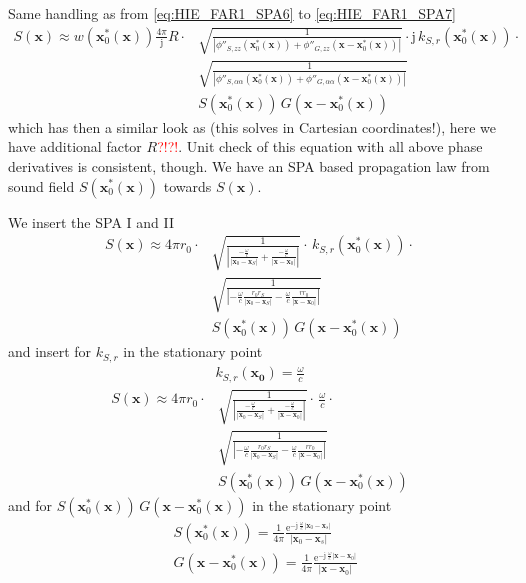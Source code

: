 \documentclass[a4paper,BCOR=15mm,10pt,twoside]{scrartcl}
\newcommand{\fscom}[2][red]{\textcolor{#1}{#2}}  %
\newcommand\e{\mathrm{e}}  %
\newcommand\im{\mathrm{j}}  %
\newcommand\wc{\frac{\omega}{c}}  %
\newcommand\jwc{\im\,\frac{\omega}{c}}  %
\newcommand\azx{\alpha}  %
\renewcommand{\vec}[1]{\mathbf{#1}}  %
\begin{document}
Same handling as from \eqref{eq:HIE_FAR1_SPA6} to \eqref{eq:HIE_FAR1_SPA7}
\begin{align}
S(\vec{x}) \approx w(\vec{x}_0^*(\vec{x})) \frac{4\pi}{\im}R \cdot
&  
\sqrt{\frac{1}{|\phi''_{S,zz}(\vec{x}_0^*(\vec{x}))+\phi''_{G,zz}(\vec{x}-\vec{x}_0^*(\vec{x}))|}} 
\cdot \im \, 
k_{S,r}(\vec{x}_0^*(\vec{x}))
\cdot\nonumber\\
&
\sqrt{\frac{1}{|\phi''_{S,\azx\azx}(\vec{x}_0^*(\vec{x}))+\phi''_{G,\azx\azx}(\vec{x}-\vec{x}_0^*(\vec{x}))|}}\nonumber\\
&
S(\vec{x}_0^*(\vec{x}))\,G(\vec{x}-\vec{x}_0^*(\vec{x}))
\end{align}
which has then a similar look as \cite[(38)]{Firtha2018} (this solves in Cartesian coordinates!), here we have additional factor $R$\fscom{?!?!}.
Unit check of this equation with all above phase derivatives is consistent, though.
We have an SPA based propagation law from sound field $S(\vec{x}_0^*(\vec{x}))$ towards $S(\vec{x})$.


We insert the SPA I and II
\begin{align}
S(\vec{x}) \approx 4 \pi r_0 \cdot
&  
\sqrt{\frac{1}{|\frac{-\wc}{|\vec{x}_0-\vec{x}_S|}+\frac{-\wc}{|\vec{x}-\vec{x}_0|}|}} 
\cdot \, 
k_{S,r}(\vec{x}_0^*(\vec{x}))
\cdot\nonumber\\
&
\sqrt{\frac{1}{|-\wc \frac{r_0 r_S}{|\vec{x}_0 -\vec{x}_S|}-\wc \frac{r r_0}{|\vec{x} -\vec{x}_0|}|}}\nonumber\\
&
S(\vec{x}_0^*(\vec{x}))\,G(\vec{x}-\vec{x}_0^*(\vec{x}))
\end{align}
and insert for $k_{S,r}$ in the stationary point
\begin{align}
k_{S,r}(\vec{x_0}) = \wc
\end{align}
\begin{align}
S(\vec{x}) \approx 4 \pi r_0 \cdot
&  
\sqrt{\frac{1}{|\frac{-\wc}{|\vec{x}_0-\vec{x}_S|}+\frac{-\wc}{|\vec{x}-\vec{x}_0|}|}} 
\cdot \, 
\wc
\cdot\nonumber\\
&
\sqrt{\frac{1}{|-\wc \frac{r_0 r_S}{|\vec{x}_0 -\vec{x}_S|}-\wc \frac{r r_0}{|\vec{x} -\vec{x}_0|}|}}\nonumber\\
&
S(\vec{x}_0^*(\vec{x}))\,G(\vec{x}-\vec{x}_0^*(\vec{x}))
\end{align}
and for $S(\vec{x}_0^*(\vec{x}))\,G(\vec{x}-\vec{x}_0^*(\vec{x}))$  in the stationary point
\begin{align}
&S(\vec{x}_0^*(\vec{x})) = \frac{1}{4\pi} \frac{\e^{-\jwc |\vec{x}_0-\vec{x}_s|}}{|\vec{x}_0-\vec{x}_s|}\\
&G(\vec{x}-\vec{x}_0^*(\vec{x})) = \frac{1}{4\pi} \frac{\e^{-\jwc |\vec{x}-\vec{x}_0|}}{|\vec{x}-\vec{x}_0|}
\end{align}
\end{document}
